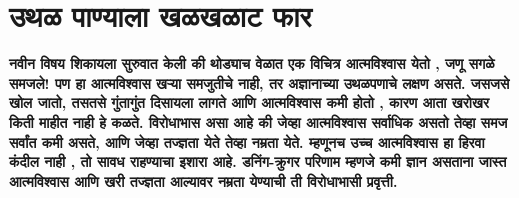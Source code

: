 \chapter{उथळ पाण्याला खळखळाट फार}

\textcolor{blue!60!black}{\textbf{नवीन विषय शिकायला सुरुवात केली की थोड्याच वेळात एक विचित्र आत्मविश्वास येतो , जणू सगळे समजले! पण हा आत्मविश्वास खऱ्या समजुतीचे नाही, तर अज्ञानाच्या उथळपणाचे लक्षण असते. जसजसे खोल जातो, तसतसे गुंतागुंत दिसायला लागते आणि आत्मविश्वास कमी होतो , कारण आता खरोखर किती माहीत नाही हे कळते. विरोधाभास असा आहे की जेव्हा आत्मविश्वास सर्वाधिक असतो तेव्हा समज सर्वांत कमी असते, आणि जेव्हा तज्ज्ञता येते तेव्हा नम्रता येते. म्हणूनच उच्च आत्मविश्वास हा हिरवा कंदील नाही , तो सावध राहण्याचा इशारा आहे. डनिंग-क्रुगर परिणाम म्हणजे कमी ज्ञान असताना जास्त आत्मविश्वास आणि खरी तज्ज्ञता आल्यावर नम्रता येण्याची ती विरोधाभासी प्रवृत्ती.}}

